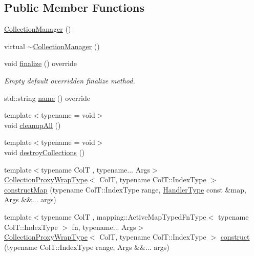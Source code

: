 \subsection*{Public Member Functions}
\begin{DoxyCompactItemize}
\item 
\hyperlink{structvt_1_1vrt_1_1collection_1_1_collection_manager_ad6c6c75f1f54ae5470847311256ae8c3}{Collection\+Manager} ()
\item 
virtual \hyperlink{structvt_1_1vrt_1_1collection_1_1_collection_manager_aea0c10371b37041bcc855eef0c767b85}{$\sim$\+Collection\+Manager} ()
\item 
void \hyperlink{structvt_1_1vrt_1_1collection_1_1_collection_manager_afafcdbf36f42835471218b654252031c}{finalize} () override
\begin{DoxyCompactList}\small\item\em Empty default overridden finalize method. \end{DoxyCompactList}\item 
std\+::string \hyperlink{structvt_1_1vrt_1_1collection_1_1_collection_manager_af7cc4c83ae2792595eee99a3206ed633}{name} () override
\item 
{\footnotesize template$<$typename  = void$>$ }\\void \hyperlink{structvt_1_1vrt_1_1collection_1_1_collection_manager_a7d98e5aaa63d70cbabfbcf78a6cf503f}{cleanup\+All} ()
\item 
{\footnotesize template$<$typename  = void$>$ }\\void \hyperlink{structvt_1_1vrt_1_1collection_1_1_collection_manager_a71865b0508bab58b6d44b44416f11983}{destroy\+Collections} ()
\item 
{\footnotesize template$<$typename ColT , typename... Args$>$ }\\\hyperlink{structvt_1_1vrt_1_1collection_1_1_collection_manager_a56458ed7f9bb22b631b9b3a745f42f94}{Collection\+Proxy\+Wrap\+Type}$<$ ColT, typename Col\+T\+::\+Index\+Type $>$ \hyperlink{structvt_1_1vrt_1_1collection_1_1_collection_manager_a07aebc3fa25e2fe901eedc5db722655f}{construct\+Map} (typename Col\+T\+::\+Index\+Type range, \hyperlink{namespacevt_af64846b57dfcaf104da3ef6967917573}{Handler\+Type} const \&map, Args \&\&... args)
\item 
{\footnotesize template$<$typename ColT , mapping\+::\+Active\+Map\+Typed\+Fn\+Type$<$ typename Col\+T\+::\+Index\+Type $>$ fn, typename... Args$>$ }\\\hyperlink{structvt_1_1vrt_1_1collection_1_1_collection_manager_a56458ed7f9bb22b631b9b3a745f42f94}{Collection\+Proxy\+Wrap\+Type}$<$ ColT, typename Col\+T\+::\+Index\+Type $>$ \hyperlink{structvt_1_1vrt_1_1collection_1_1_collection_manager_a4de84e9efd7a3948e3c20be549441cfd}{construct} (typename Col\+T\+::\+Index\+Type range, Args \&\&... args)

\end{DoxyCompactItemize}

